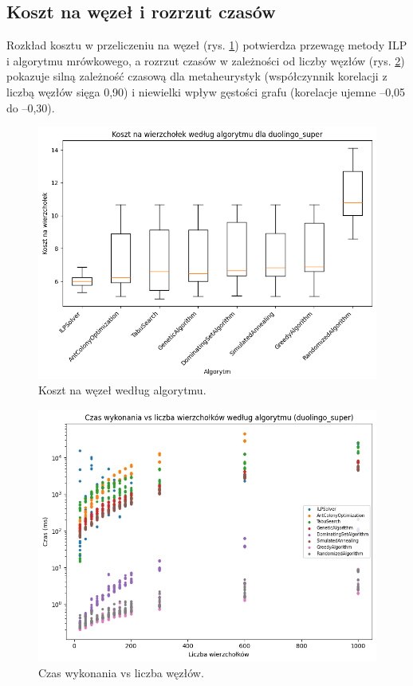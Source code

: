 \subsection{Koszt na węzeł i rozrzut czasów}

Rozkład kosztu w przeliczeniu na węzeł (rys. \ref{fig:synthetic_cost_per_node}) potwierdza przewagę metody ILP i algorytmu mrówkowego, a rozrzut czasów w zależności od liczby węzłów (rys. \ref{fig:synthetic_time_scatter}) pokazuje silną zależność czasową dla metaheurystyk (współczynnik korelacji z liczbą węzłów sięga 0,90) i niewielki wpływ gęstości grafu (korelacje ujemne --0,05 do --0,30).

\begin{figure}[H]
  \centering
  \includegraphics[width=0.7\linewidth]{assets/figures/synthetic_cost_per_node.png}
  \caption{Koszt na węzeł według algorytmu.}
  \label{fig:synthetic_cost_per_node}
\end{figure}

\begin{figure}[H]
  \centering
  \includegraphics[width=0.7\linewidth]{assets/figures/synthetic_time_scatter.png}
  \caption{Czas wykonania vs liczba węzłów.}
  \label{fig:synthetic_time_scatter}
\end{figure}


